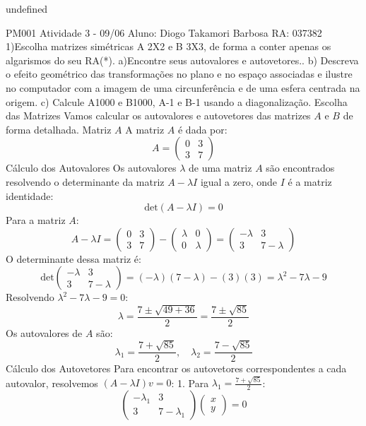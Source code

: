 undefined

PM001 Atividade 3 - 09/06
Aluno: Diogo Takamori Barbosa 
RA: 037382
1)Escolha matrizes simétricas A 2X2 e B 3X3, de forma a conter apenas os algarismos do seu RA(*).
a)Encontre seus autovalores e autovetores..
b) Descreva o efeito geométrico das transformações no plano e no espaço associadas e ilustre no
computador com a imagem de uma circunferência e de uma esfera centrada na origem.
c) Calcule A1000 e B1000, A-1 e B-1 usando a diagonalização.
Escolha das Matrizes
Vamos calcular os autovalores e autovetores das matrizes \(A\) e \(B\) de forma detalhada. 
Matriz \(A\)
A matriz \(A\) é dada por:
\[ A = \left(\begin{array}{cc} 0 & 3 \\ 3 & 7 \end{array}\right) \]
Cálculo dos Autovalores
Os autovalores \(\lambda\) de uma matriz \(A\) são encontrados resolvendo o determinante da matriz \(A - \lambda I\) igual a zero, onde \(I\) é a matriz identidade:
\[
\text{det}(A - \lambda I) = 0
\]
Para a matriz \(A\):
\[
A - \lambda I = \left(\begin{array}{cc} 0 & 3 \\ 3 & 7 \end{array}\right) - \left(\begin{array}{cc} \lambda & 0 \\ 0 & \lambda \end{array}\right) = \left(\begin{array}{cc} -\lambda & 3 \\ 3 & 7-\lambda \end{array}\right)
\]
O determinante dessa matriz é:
\[
\text{det}\left(\begin{array}{cc} -\lambda & 3 \\ 3 & 7-\lambda \end{array}\right) = (-\lambda)(7-\lambda) - (3)(3) = \lambda^2 - 7\lambda - 9
\]
Resolvendo \(\lambda^2 - 7\lambda - 9 = 0\):
\[
\lambda = \frac{7 \pm \sqrt{49 + 36}}{2} = \frac{7 \pm \sqrt{85}}{2}
\]
Os autovalores de \(A\) são:
\[
\lambda_1 = \frac{7 + \sqrt{85}}{2}, \quad \lambda_2 = \frac{7 - \sqrt{85}}{2}
\]
Cálculo dos Autovetores
Para encontrar os autovetores correspondentes a cada autovalor, resolvemos \((A - \lambda I)v = 0\):
1. Para \(\lambda_1 = \frac{7 + \sqrt{85}}{2}\):
\[
\left(\begin{array}{cc} -\lambda_1 & 3 \\ 3 & 7-\lambda_1 \end{array}\right) \left(\begin{array}{c} x \\ y \end{array}\right) = 0
\]
